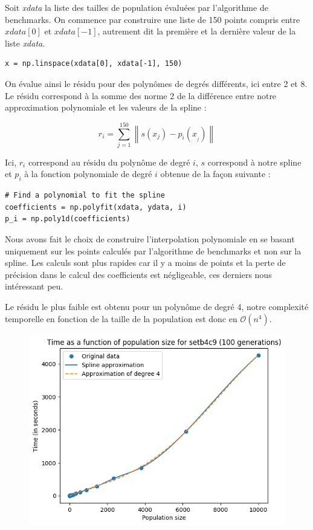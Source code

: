 Soit \textit{xdata} la liste des tailles de population évaluées par l'algorithme de benchmarks. On commence par construire une liste de 150 points compris entre $xdata[0]$ et $xdata[-1]$, autrement dit la première et la dernière valeur de la liste \textit{xdata}.

\begin{lstlisting}
x = np.linspace(xdata[0], xdata[-1], 150)
\end{lstlisting}

On évalue ainsi le résidu pour des polynômes de degrés différents, ici entre 2 et 8. Le résidu correspond à la somme des norme 2 de la différence entre notre approximation polynomiale et les valeurs de la spline :

$$ r_i = \sum_{j = 1}^{150} \left\| s(x_j) - p_i(x__j) \right\| $$

Ici, $r_i$ correspond au résidu du polynôme de degré $i$, $s$ correspond à notre spline et $p_i$ à la fonction polynomiale de degré $i$ obtenue de la façon suivante :

\begin{lstlisting}
# Find a polynomial to fit the spline
coefficients = np.polyfit(xdata, ydata, i)
p_i = np.poly1d(coefficients)
\end{lstlisting}

Nous avons fait le choix de construire l'interpolation polynomiale en se basant uniquement sur les points calculés par l'algorithme de benchmarks et non sur la spline. Les calculs sont plus rapides car il y a moins de points et la perte de précision dans le calcul des coefficients est négligeable, ces derniers nous intéressant peu.

Le résidu le plus faible est obtenu pour un polynôme de degré 4, notre complexité temporelle en fonction de la taille de la population est donc en $\mathcal{O}(n^4)$.

\begin{figure}[!h]
    \centering
    \includegraphics[]{report/Pictures/setb4c9_benchmarks_population_approximated.png}
\end{figure}

